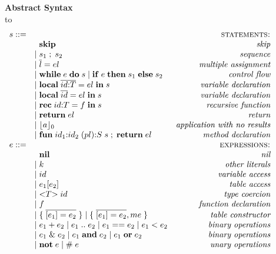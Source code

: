 \documentclass{sigplanconf}
\def\dstart{\hbox to \hsize{\vrule depth 4pt\hrulefill\vrule depth 4pt}}
\begin{document}
\begin{figure*}[!ht]
\textbf{Abstract Syntax}\\
\dstart
$$
\begin{array}{rlr}
s ::= & & \textsc{statements:}\\
& \;\; \mathbf{skip} & \textit{skip}\\
& | \; s_{1} \; ; \; s_{2} & \textit{sequence}\\
& | \; \overline{l} = el & \textit{multiple assignment}\\
& | \; \mathbf{while} \; e \; \mathbf{do} \; s \;
| \; \mathbf{if} \; e \; \mathbf{then} \; s_{1} \; \mathbf{else} \; s_{2} & \textit{control flow}\\
& | \; \mathbf{local} \; \overline{id{:}T} = el \; \mathbf{in} \; s & \textit{variable declaration}\\
& | \; \mathbf{local} \; \overline{id} = el \; \mathbf{in} \; s & \textit{variable declaration}\\
& | \; \mathbf{rec} \; id{:}T = f \; \mathbf{in} \; s & \textit{recursive function} \\
& | \; \mathbf{return} \; el & \textit{return} \\
& | \; \lfloor a \rfloor_{0} & \textit{application with no results}\\
& | \; \mathbf{fun} \; id_{1}{:}id_{2} \; (pl){:}S \; s \;;\; \mathbf{return} \; el & \textit{method declaration}\\
e ::= & & \textsc{expressions:}\\
& \;\; \mathbf{nil} & \textit{nil}\\
& | \; k & \textit{other literals}\\
& | \; id & \textit{variable access}\\
& | \; e_{1}[e_{2}] & \textit{table access}\\
& | \; {<}T{>} \; id & \textit{type coercion}\\
& | \; f & \textit{function declaration}\\
& | \; \{ \; \overline{[e_{1}] = e_{2}} \; \} \;
| \; \{ \; \overline{[e_{1}] = e_{2}},me \; \} & \textit{table constructor}\\
& | \; e_{1} + e_{2} \;
| \; e_{1} \; {..} \; e_{2} \;
| \; e_{1} == e_{2} \;
| \; e_{1} < e_{2} & \textit{binary operations}\\
& | \; e_{1} \;\&\; e_{2} \;
| \; e_{1} \; \mathbf{and} \; e_{2} \;
| \; e_{1} \; \mathbf{or} \; e_{2} & \textit{binary operations}\\
& | \; \mathbf{not} \; e \;
| \; \# \; e & \textit{unary operations} \\

\end{array}$$
\end{figure*}
\end{document}
